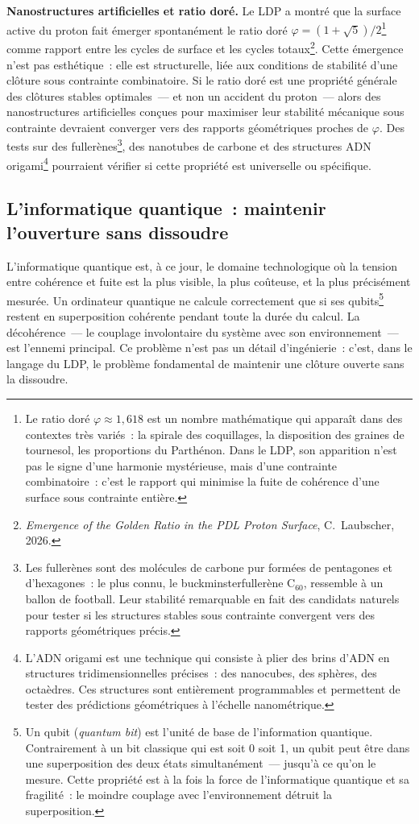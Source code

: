 \documentclass[12pt, a4paper, openright]{book}
\begin{document}
\textbf{Nanostructures artificielles et ratio doré.} Le LDP a montré que la surface active du proton fait émerger spontanément le ratio doré $\varphi = (1+\sqrt{5})/2$\footnote{Le ratio doré $\varphi \approx 1{,}618$ est un nombre mathématique qui apparaît dans des contextes très variés~: la spirale des coquillages, la disposition des graines de tournesol, les proportions du Parthénon. Dans le LDP, son apparition n'est pas le signe d'une harmonie mystérieuse, mais d'une contrainte combinatoire~: c'est le rapport qui minimise la fuite de cohérence d'une surface sous contrainte entière.} comme rapport entre les cycles de surface et les cycles totaux\footnote{\textit{Emergence of the Golden Ratio in the PDL Proton Surface}, C.~Laubscher, 2026.}. Cette émergence n'est pas esthétique~: elle est structurelle, liée aux conditions de stabilité d'une clôture sous contrainte combinatoire. Si le ratio doré est une propriété générale des clôtures stables optimales~--- et non un accident du proton~--- alors des nanostructures artificielles conçues pour maximiser leur stabilité mécanique sous contrainte devraient converger vers des rapports géométriques proches de $\varphi$. Des tests sur des fullerènes\footnote{Les fullerènes sont des molécules de carbone pur formées de pentagones et d'hexagones~: le plus connu, le buckminsterfullerène C$_{60}$, ressemble à un ballon de football. Leur stabilité remarquable en fait des candidats naturels pour tester si les structures stables sous contrainte convergent vers des rapports géométriques précis.}, des nanotubes de carbone et des structures ADN origami\footnote{L'ADN origami est une technique qui consiste à plier des brins d'ADN en structures tridimensionnelles précises~: des nanocubes, des sphères, des octaèdres. Ces structures sont entièrement programmables et permettent de tester des prédictions géométriques à l'échelle nanométrique.} pourraient vérifier si cette propriété est universelle ou spécifique.

\subsection*{L'informatique quantique~: maintenir l'ouverture sans dissoudre}

L'informatique quantique est, à ce jour, le domaine technologique où la tension entre cohérence et fuite est la plus visible, la plus coûteuse, et la plus précisément mesurée. Un ordinateur quantique ne calcule correctement que si ses qubits\footnote{Un qubit (\textit{quantum bit}) est l'unité de base de l'information quantique. Contrairement à un bit classique qui est soit 0 soit 1, un qubit peut être dans une superposition des deux états simultanément~--- jusqu'à ce qu'on le mesure. Cette propriété est à la fois la force de l'informatique quantique et sa fragilité~: le moindre couplage avec l'environnement détruit la superposition.} restent en superposition cohérente pendant toute la durée du calcul. La décohérence~--- le couplage involontaire du système avec son environnement~--- est l'ennemi principal. Ce problème n'est pas un détail d'ingénierie~: c'est, dans le langage du LDP, le problème fondamental de maintenir une clôture ouverte sans la dissoudre.
\end{document}
